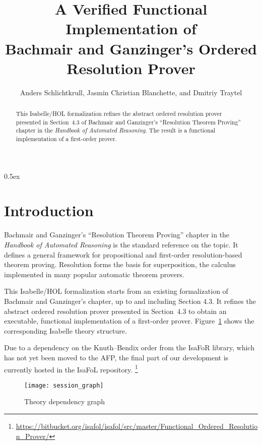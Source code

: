 \documentclass[10pt,a4paper]{article}
\begin{document}
\title{A Verified Functional Implementation of \\ Bachmair and Ganzinger's Ordered Resolution Prover}
\author{Anders Schlichtkrull, Jasmin Christian Blanchette, and Dmitriy Traytel}

\maketitle

\begin{abstract}
\noindent
This Isabelle/HOL formalization refines the abstract ordered resolution prover
presented in Section~4.3 of Bachmair and Ganzinger's ``Resolution Theorem
Proving'' chapter in the \emph{Handbook of Automated Reasoning}. The result
is a functional implementation of a first-order prover.
\end{abstract}

\tableofcontents

\parindent 0pt
\parskip 0.5ex

\section{Introduction}

Bachmair and Ganzinger's ``Resolution Theorem Proving'' chapter
in the \emph{Handbook of Automated Reasoning} is the standard reference on the
topic. It defines a general framework for propositional and first-order
resolution-based theorem proving. Resolution forms the basis for
superposition, the calculus implemented in many popular automatic theorem
provers.

\medskip

This Isabelle/HOL formalization starts from an existing formalization of
Bachmair and Ganzinger's chapter, up to and including Section 4.3. It refines
the abstract ordered resolution prover presented in Section~4.3 to obtain an
executable, functional implementation of a first-order prover.
Figure~\ref{fig:thys} shows the corresponding Isabelle theory structure.

\medskip

Due to a dependency on the Knuth--Bendix order from the \textsf{IsaFoR}
library, which has not yet been moved to the AFP, the final part of our
development is currently hosted in the IsaFoL repository.%
\footnote{\url{https://bitbucket.org/isafol/isafol/src/master/Functional_Ordered_Resolution_Prover/}}

\begin{figure}
\begin{center}
  \texttt{[image: session\_graph]}
\end{center}
\caption{Theory dependency graph}
\label{fig:thys}
\end{figure}



% 
% 
\end{document}
